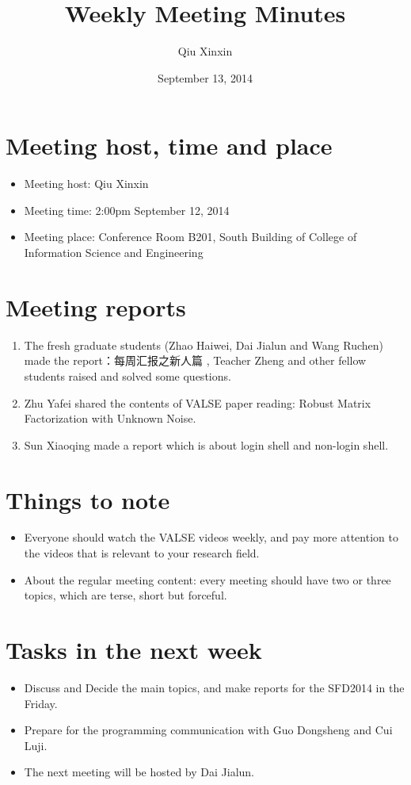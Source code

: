 \documentclass[a4paper，12pt]{article}
\title{Weekly Meeting Minutes}
\author{Qiu Xinxin}
\date{September 13, 2014}
\begin{document}
\maketitle

\section{Meeting host, time and place}

\begin{itemize}
\item Meeting host: Qiu Xinxin
\item Meeting time: 2:00pm September 12, 2014 
\item Meeting place: Conference Room B201, South Building of College of Information Science and Engineering 
\end{itemize}

\section{Meeting reports}

\begin{enumerate}
\item The fresh graduate students (Zhao Haiwei, Dai Jialun and Wang Ruchen) made the report：每周汇报之新人篇 , Teacher Zheng and other fellow students raised and solved some questions. 
\item Zhu Yafei shared the contents of VALSE paper reading: Robust Matrix Factorization with Unknown Noise.
\item Sun Xiaoqing made a report which is about login shell and non-login shell. 
\end{enumerate}

\section {Things to note}

\begin{itemize}
\item Everyone should watch the VALSE videos weekly, and pay more attention to the videos that is relevant to your research field.
\item About the regular meeting content: every meeting should have two or three topics, which are terse, short but forceful.
\end{itemize}

\section {Tasks in the next week }

\begin{itemize}
\item Discuss and Decide the main topics,  and make reports for the SFD2014 in the Friday.
\item Prepare for the programming communication with Guo Dongsheng and Cui Luji.
\item The next meeting will be hosted by Dai Jialun.
\end{itemize}
\end{document}
